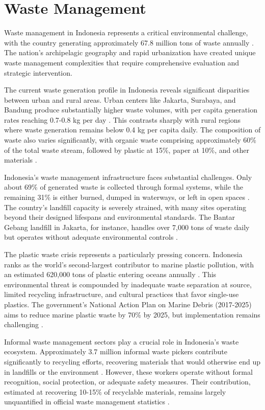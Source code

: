 \section{Waste Management}

Waste management in Indonesia represents a critical environmental challenge, with the country generating approximately 67.8 million tons of waste annually \cite{ref1}. The nation's archipelagic geography and rapid urbanization have created unique waste management complexities that require comprehensive evaluation and strategic intervention.

The current waste generation profile in Indonesia reveals significant disparities between urban and rural areas. Urban centers like Jakarta, Surabaya, and Bandung produce substantially higher waste volumes, with per capita generation rates reaching 0.7-0.8 kg per day \cite{ref2}. This contrasts sharply with rural regions where waste generation remains below 0.4 kg per capita daily. The composition of waste also varies significantly, with organic waste comprising approximately 60\% of the total waste stream, followed by plastic at 15\%, paper at 10\%, and other materials \cite{ref3}.

Indonesia's waste management infrastructure faces substantial challenges. Only about 69\% of generated waste is collected through formal systems, while the remaining 31\% is either burned, dumped in waterways, or left in open spaces \cite{ref4}. The country's landfill capacity is severely strained, with many sites operating beyond their designed lifespans and environmental standards. The Bantar Gebang landfill in Jakarta, for instance, handles over 7,000 tons of waste daily but operates without adequate environmental controls \cite{ref5}.

The plastic waste crisis represents a particularly pressing concern. Indonesia ranks as the world's second-largest contributor to marine plastic pollution, with an estimated 620,000 tons of plastic entering oceans annually \cite{ref6}. This environmental threat is compounded by inadequate waste separation at source, limited recycling infrastructure, and cultural practices that favor single-use plastics. The government's National Action Plan on Marine Debris (2017-2025) aims to reduce marine plastic waste by 70\% by 2025, but implementation remains challenging \cite{ref7}.

Informal waste management sectors play a crucial role in Indonesia's waste ecosystem. Approximately 3.7 million informal waste pickers contribute significantly to recycling efforts, recovering materials that would otherwise end up in landfills or the environment \cite{ref8}. However, these workers operate without formal recognition, social protection, or adequate safety measures. Their contribution, estimated at recovering 10-15\% of recyclable materials, remains largely unquantified in official waste management statistics \cite{ref9}.

